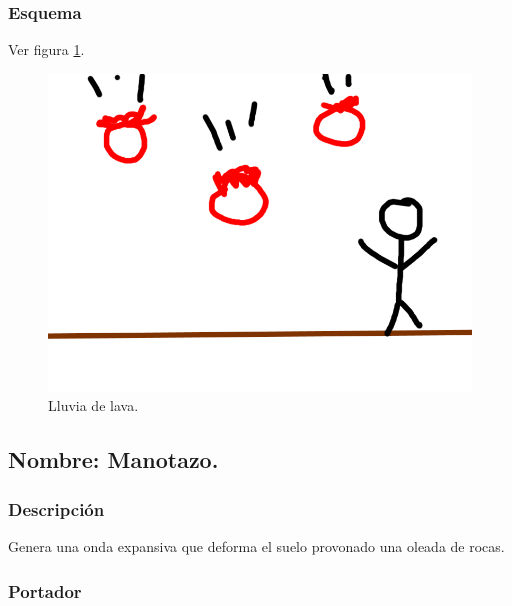 \documentclass[11pt,letterpaper]{article}
\begin{document}
\subsubsection{Esquema}	
			Ver figura \ref{fig:lluviaL}.
			\begin{figure}
				\centering
				\includegraphics[height=0.2 \textheight]{Imagenes/lluviaL}
				\caption{Lluvia de lava.}
				\label{fig:lluviaL}
			\end{figure}
\subsection{Nombre: Manotazo.}
\subsubsection{Descripción}
Genera una onda expansiva que deforma el suelo provonado una oleada de rocas.
\subsubsection{Portador}
\end{document}
